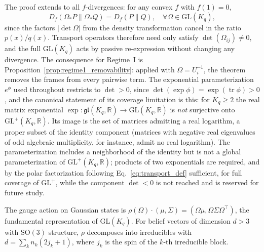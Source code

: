 The proof extends to all $f$-divergences: for any convex $f$ with $f(1) = 0$,
\begin{equation}
D_f(\Omega_* P \| \Omega_* Q) = D_f(P \| Q), \quad \forall \Omega \in \mathrm{GL}(K_q),
\end{equation}
since the factors $|\det\Omega|$ from the density transformation cancel in the ratio $p(x)/q(x)$. Transport operators therefore need only satisfy $\det(\Omega_{ij}) \neq 0$, and the full $\mathrm{GL}(K_q)$ acts by passive re-expression without changing any divergence. The consequence for Regime~I is Proposition~\ref{prop:regime1_removability}: applied with $\Omega = U_i^{-1}$, the theorem removes the frames from every pairwise term. The exponential parameterization $e^{\phi}$ used throughout restricts to $\det > 0$, since $\det(\exp\phi) = \exp(\operatorname{tr}\phi) > 0$, and the canonical statement of its coverage limitation is this: for $K_q \ge 2$ the real matrix exponential $\exp: \mathfrak{gl}(K_q, \mathbb{R}) \to \mathrm{GL}(K_q, \mathbb{R})$ is \emph{not} surjective onto $\mathrm{GL}^+(K_q, \mathbb{R})$. Its image is the set of matrices admitting a real logarithm, a proper subset of the identity component (matrices with negative real eigenvalues of odd algebraic multiplicity, for instance, admit no real logarithm). The parameterization includes a neighborhood of the identity but is not a global parameterization of $\mathrm{GL}^+(K_q, \mathbb{R})$; products of two exponentials are required, and by the polar factorization following Eq.~\eqref{eq:transport_def} sufficient, for full coverage of $\mathrm{GL}^+$, while the component $\det < 0$ is not reached and is reserved for future study.

The gauge action on Gaussian states is $\rho(\Omega)\cdot(\mu,\Sigma)=(\Omega\mu,\Omega\Sigma\Omega^\top)$, the fundamental representation of $\mathrm{GL}(K_q)$. For belief vectors of dimension $d>3$ with $\mathrm{SO}(3)$ structure, $\rho$ decomposes into irreducibles with $d=\sum_k n_k(2j_k+1)$, where $j_k$ is the spin of the $k$-th irreducible block.

